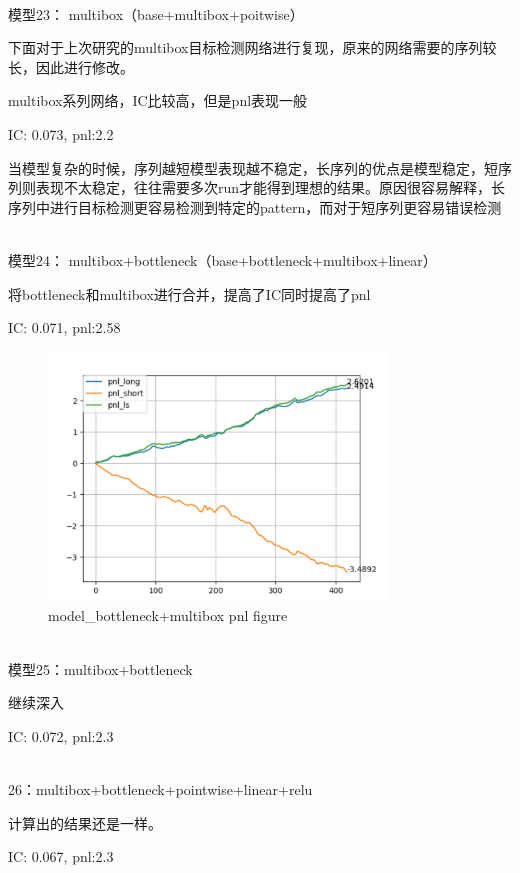 \documentclass[11pt]{ctexart}
\begin{document}
~\\
模型23： multibox（base+multibox+poitwise）

下面对于上次研究的multibox目标检测网络进行复现，原来的网络需要的序列较长，因此进行修改。

multibox系列网络，IC比较高，但是pnl表现一般

{\kaishu \small IC: 0.073, pnl:2.2}

当模型复杂的时候，序列越短模型表现越不稳定，长序列的优点是模型稳定，短序列则表现不太稳定，往往需要多次run才能得到理想的结果。原因很容易解释，长序列中进行目标检测更容易检测到特定的pattern，而对于短序列更容易错误检测

~\\
模型24： multibox+bottleneck（base+bottleneck+multibox+linear）

将bottleneck和multibox进行合并，提高了IC同时提高了pnl

{\kaishu \small IC: 0.071, pnl:2.58}

\begin{figure}[H]
\begin{center}
\includegraphics[width=0.8\textwidth]{plt3.PNG}
\end{center}
\caption{model\_bottleneck+multibox pnl figure}
\label{FIG.2}
\end{figure}

~\\
模型25：multibox+bottleneck

继续深入

{\kaishu \small IC: 0.072, pnl:2.3}


~\\26：multibox+bottleneck+pointwise+linear+relu

计算出的结果还是一样。

{\kaishu \small IC: 0.067, pnl:2.3}
\end{document}
